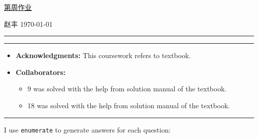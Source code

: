 \documentclass[a4paper]{article}
\begin{document}
\courseheader

\setcounter{hwcnt}{14} %

\begin{center}
  \underline{第\thehwcnt 周作业} \\
\end{center}
\begin{flushleft}
  赵丰\quad \studentID\hfill
  \today
\end{flushleft}
\hrule

\vspace{2em}

\flushleft
\rule{\textwidth}{1pt}
\begin{itemize}
\item {\bf Acknowledgments: \/} 
  This coursework refers to textbook.  
\item {\bf Collaborators: \/}
  \begin{itemize}
  \item 9 was solved with the help from solution manual of the textbook.    
  \item 18 was solved with the help from solution manual of the textbook.      
  \end{itemize}
\end{itemize}
\rule{\textwidth}{1pt}

\vspace{2em}

I use \texttt{enumerate} to generate answers for each question:
\end{document}
